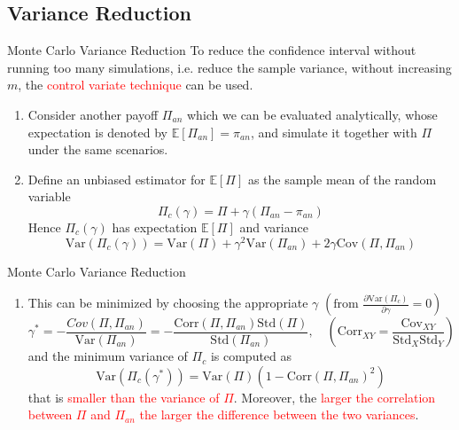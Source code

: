 \documentclass{beamer}
\begin{document}
\subsection{Variance Reduction}
\begin{frame}{Monte Carlo Variance Reduction}
  To reduce the confidence interval without running too many simulations, i.e. reduce the sample variance, without increasing $m$, the \textcolor{red}{control variate technique} can be used.
  \pause
  \begin{enumerate}
  \item<2-> Consider another payoff $\Pi_{an}$ which we can be evaluated analytically, whose expectation is denoted by $\mathbb{E}[\Pi_{an}] = \pi_{an}$, and simulate it together with $\Pi$ under the same scenarios.%
  \item<3-> Define an unbiased estimator for $\mathbb{E}[\Pi]$ as the sample mean of the random variable 
    \begin{equation*}
      \Pi_c(\gamma) = \Pi + \gamma(\Pi_{an} - \pi_{an})
    \end{equation*}
    Hence $\Pi_c(\gamma)$ has expectation $\mathbb{E}[\Pi]$ and variance
    \begin{equation*}
      \text{Var}(\Pi_c(\gamma)) = \text{Var}(\Pi) + \gamma^2 \text{Var}(\Pi_{an}) + 2\gamma \text{Cov}(\Pi, \Pi_{an})
    \end{equation*}
  \end{enumerate}
\end{frame}

\begin{frame}{Monte Carlo Variance Reduction}
	\begin{enumerate}\addtocounter{enumi}{2}
	\item This can be minimized by choosing the appropriate $\gamma$ $\left(\text{from }\frac{\partial \text{Var}(\Pi_c)}{\partial\gamma}=0\right)$
	\begin{equation*}
	\gamma^* = -\frac{Cov(\Pi, \Pi_{an})}{\text{Var}(\Pi_{an})} = -\frac{\text{Corr}(\Pi, \Pi_{an})\text{Std}(\Pi)}{\text{Std}(\Pi_{an})}, \quad \left(\text{Corr}_{XY}=\frac{\text{Cov}_{XY}}{\text{Std}_X \text{Std}_Y}\right)
	\end{equation*}
  	and the minimum variance of $\Pi_c$ is computed as
    \begin{equation*}
     \text{Var}(\Pi_c(\gamma^*)) = \text{Var}(\Pi)(1 - \text{Corr}(\Pi, \Pi_{an})^2)
    \end{equation*}
    that is \textcolor{red}{smaller than the variance of $\Pi$}. Moreover, the \textcolor{red}{larger the correlation between $\Pi$ and $\Pi_{an}$ the larger the difference between the two variances}.
  \end{enumerate}
\end{frame}
\end{document}
